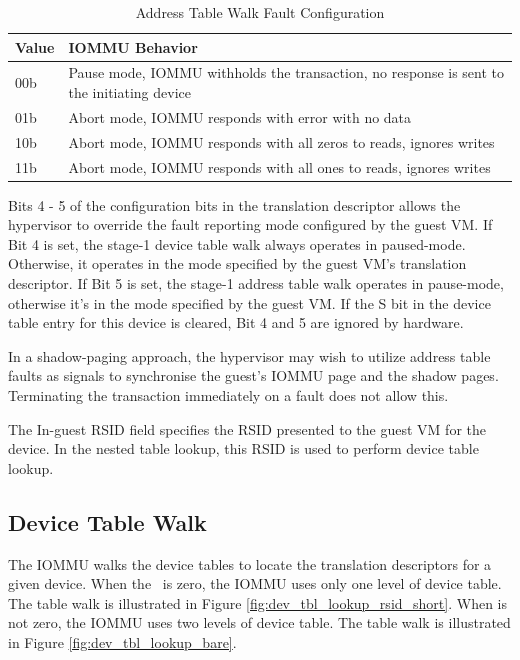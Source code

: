 \begin{table}[h!t]
    \centering
    \begin{tabular}{ | l | l | }

    \hline
    Value  &  IOMMU Behavior  \\
    \hline
    00b  &  Pause mode, IOMMU withholds the transaction, no response is sent to the initiating device  \\
    \hline
    01b &   Abort mode, IOMMU responds with error with no data  \\
    \hline
    10b &   Abort mode, IOMMU responds with all zeros to reads, ignores writes  \\
    \hline
    11b &   Abort mode, IOMMU responds with all ones to reads, ignores writes  \\
    \hline

    \end{tabular}
    \caption{Address Table Walk Fault Configuration}
    \label{tbl:addr_tbl_walk_conf}
\end{table}

Bits 4 - 5 of the configuration bits in the translation descriptor allows the hypervisor
to override the fault reporting mode configured by the guest VM. If Bit 4 is set, the
stage-1 device table walk always operates in paused-mode. Otherwise, it operates in the
mode specified by the guest VM's translation descriptor. If Bit 5 is set, the stage-1
address table walk operates in pause-mode, otherwise it's in the mode specified by the
guest VM. If the S bit in the device table entry for this device is cleared, Bit 4 and 5
are ignored by hardware.

\note In a shadow-paging approach, the hypervisor may wish to utilize address table faults
as signals to synchronise the guest's IOMMU page and the shadow pages. Terminating the
transaction immediately on a fault does not allow this. \noteend

The In-guest RSID field specifies the RSID presented to the guest VM for the device. In
the nested table lookup, this RSID is used to perform device table lookup.

\subsection{Device Table Walk}

The IOMMU walks the device tables to locate the translation descriptors for a given
device. When the \rsiddiv\ is zero, the IOMMU uses only one level of device table. The
table walk is illustrated in Figure \ref{fig:dev_tbl_lookup_rsid_short}. When \rsiddiv is
not zero, the IOMMU uses two levels of device table. The table walk is illustrated in
Figure \ref{fig:dev_tbl_lookup_bare}.

